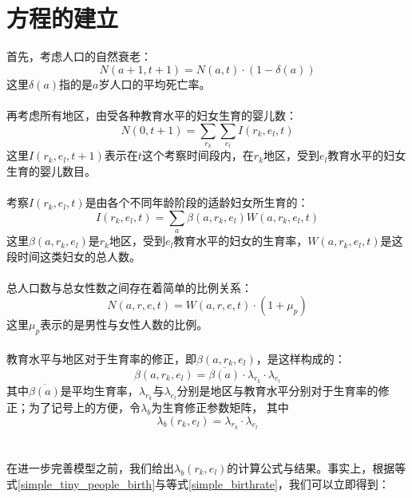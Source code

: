 \documentclass[a4paper]{article}
\begin{document}
\section{方程的建立}
首先，考虑人口的自然衰老：
	\begin{equation}
		\label{simple_people_aging}
		N(a+1,t+1) = N(a,t) \cdot (1-\delta (a))
	\end{equation}
这里$\delta (a)$指的是$a$岁人口的平均死亡率。\\\\
\indent
再考虑所有地区，由受各种教育水平的妇女生育的婴儿数：
	\begin{equation}
		\label{simple_people_birth}
		N(0,t+1) = \sum_{r_k} \sum_{e_l} I(r_k, e_l, t)
	\end{equation}
这里$I(r_k, e_l, t+1)$表示在$t$这个考察时间段内，在$r_k$地区，受到$e_l$教育水平的妇女生育的婴儿数目。\\\\
\indent
考察$I(r_k, e_l, t)$是由各个不同年龄阶段的适龄妇女所生育的：
	\begin{equation}
		\label{simple_tiny_people_birth}
		I(r_k, e_l, t) = \sum_a \beta(a, r_k, e_l)W(a, r_k, e_l, t)
	\end{equation}
这里$\beta(a, r_k, e_l)$是$r_k$地区，受到$e_l$教育水平的妇女的生育率，$W(a, r_k, e_l, t)$是这段时间这类妇女的总人数。\\\\
\indent
总人口数与总女性数之间存在着简单的比例关系：
	\begin{equation}
		\label{simple_ratio_people_female}
		N(a,r,e,t) = W(a,r,e,t) \cdot (1+\mu_p)
	\end{equation}
这里$\mu_p$表示的是男性与女性人数的比例。\\\\
\indent
教育水平与地区对于生育率的修正，即$\beta(a, r_k, e_l)$，是这样构成的：
	\begin{equation}
		\label{simple_birthrate}
		\beta(a, r_k, e_l) = \overline{\beta(a)} \cdot \lambda_{r_k} \cdot \lambda_{e_l}
	\end{equation}
其中$\overline{\beta(a)}$是平均生育率，$\lambda_{r_k}$与$\lambda_{e_l}$分别是地区与教育水平分别对于生育率的修正；为了记号上的方便，令$\lambda_b$为生育修正参数矩阵， 其中
	\begin{equation}
		\label{simple_birthrate_factor}
		\lambda_b(r_k,e_l) = \lambda_{r_k} \cdot \lambda_{e_l}
	\end{equation}
\\\\
\indent
在进一步完善模型之前，我们给出$\lambda_b(r_k,e_l)$的计算公式与结果。事实上，根据等式\ref{simple_tiny_people_birth}与等式\ref{simple_birthrate}，我们可以立即得到：
\end{document}
